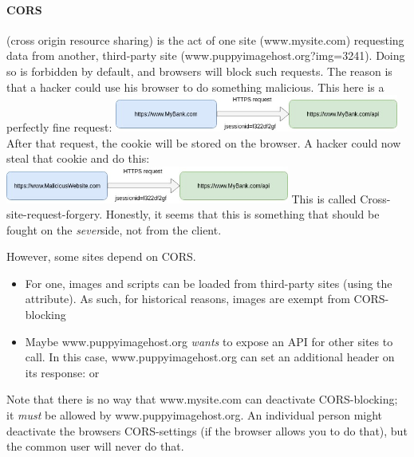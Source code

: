 \paragraph{CORS} (cross origin resource sharing) is the act of one site (www.mysite.com) requesting data from another, third-party site (www.puppyimagehost.org?img=3241). Doing so is forbidden by default, and browsers will block such requests. The reason is that a hacker could use his browser to do something malicious. This here is a perfectly fine request: 
\includegraphics[width=0.7\textwidth]{images/cookie_3.jpg}
After that request, the  cookie will be stored on the browser. A hacker could now steal that cookie and do this: 
\includegraphics[width=0.7\textwidth]{images/cookie_4.jpg}
This is called Cross-site-request-forgery. Honestly, it seems that this is something that should be fought on the \emph{sever}side, not from the client.


However, some sites depend on CORS.
\begin{itemize}
	\item For one, images and scripts can be loaded from third-party sites (using the  attribute). As such, for historical reasons, images are exempt from CORS-blocking
	\item Maybe www.puppyimagehost.org \emph{wants} to expose an API for other sites to call. In this case, www.puppyimagehost.org can set an additional header on its response:  or 
\end{itemize}
Note that there is no way that www.mysite.com can deactivate CORS-blocking; it \emph{must} be allowed by www.puppyimagehost.org. An individual person might deactivate the browsers CORS-settings (if the browser allows you to do that), but the common user will never do that. 

